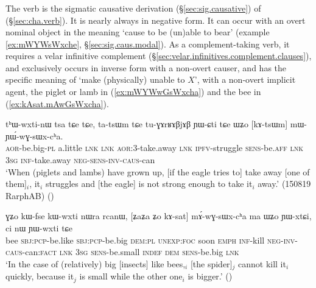 \subsubsection{} \label{sec:sWxcha}
The verb  is the sigmatic causative derivation (§\ref{sec:sig.causative}) of  (§\ref{sec:cha.verb}). It is nearly always in negative form. It can occur with an overt nominal object in the meaning `cause to be (un)able to bear' (example \ref{ex:mWYWsWxche}, §\ref{sec:sig.caus.modal}). As a complement-taking verb, it requires a velar infinitive complement (§\ref{sec:velar.infinitives.complement.clauses}), and exclusively occurs in inverse form with a non-overt causer, and has the specific meaning of `make (physically) unable to $X$', with a non-overt implicit agent, the piglet or lamb in (\ref{ex:mWYWwGsWxcha}) and the bee in (\ref{ex:kAsat.mAwGsWxcha}).

\begin{exe}
\ex \label{ex:mWYWwGsWxcha}
\gll tʰɯ-wxti-nɯ tsa tɕe tɕe, ta-tsɯm tɕe tu-ɣɤrʁɤβjɤβ ɲɯ-ɕti tɕe ɯʑo [kɤ-tsɯm] mɯ-ɲɯ́-wɣ-sɯx-cʰa. \\
\textsc{aor}-be.big-\textsc{pl} a.little \textsc{lnk}  \textsc{lnk} \textsc{aor}:3\flobv{}-take.away \textsc{lnk} \textsc{ipfv}-struggle \textsc{sens}-be.\textsc{aff}   \textsc{lnk} \textsc{3sg} \textsc{inf}-take.away \textsc{neg}-\textsc{sens}-\textsc{inv}-\textsc{caus}-can \\
\glt `When (piglets and lambs) have grown up, [if the eagle tries to] take away [one of them]$_i$, it$_i$ struggles and [the eagle] is not strong enough to take it$_i$ away.' (150819 RarphAB)
()
\end{exe}	

\begin{exe}
\ex \label{ex:kAsat.mAwGsWxcha}
\gll  ɣʑo kɯ-fse kɯ-wxti nɯra rcanɯ, [ʑaʑa ʑo kɤ-sat] mɤ́-wɣ-sɯx-cʰa ma ɯʑo ɲɯ-xtɕi, ci nɯ ɲɯ-wxti tɕe \\
bee \textsc{sbj}:\textsc{pcp}-be.like \textsc{sbj}:\textsc{pcp}-be.big \textsc{dem}:\textsc{pl} \textsc{unexp}:\textsc{foc} soon \textsc{emph} \textsc{inf}-kill \textsc{neg}-\textsc{inv}-\textsc{caus}-can:\textsc{fact} \textsc{lnk} \textsc{3sg} \textsc{sens}-be.small \textsc{indef} \textsc{dem} \textsc{sens}-be.big \textsc{lnk} \\
\glt `In the case of (relatively) big [insects] like bees,$_i$ [the spider]$_j$ cannot kill it$_i$ quickly, because it$_j$ is small while the other one$_i$ is bigger.' 
()
\end{exe}	

